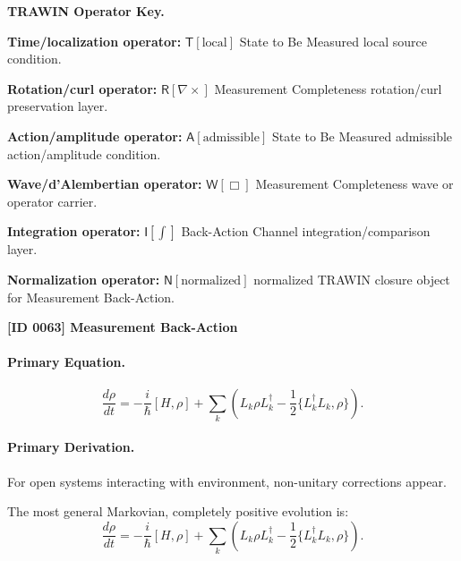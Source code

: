 \par\vspace{0.45\baselineskip}
\noindent\begin{minipage}[t]{\linewidth}
\begingroup
\small
\raggedright
\textbf{TRAWIN Operator Key.}\par
\noindent\textbf{Time/localization operator:} $\mathsf{T}\!\left[\mathrm{local}\right]$ State to Be Measured local source condition.\par
\noindent\textbf{Rotation/curl operator:} $\mathsf{R}\!\left[\nabla\times\right]$ Measurement Completeness rotation/curl preservation layer.\par
\noindent\textbf{Action/amplitude operator:} $\mathsf{A}\!\left[\mathrm{admissible}\right]$ State to Be Measured admissible action/amplitude condition.\par
\noindent\textbf{Wave/d'Alembertian operator:} $\mathsf{W}\!\left[\Box\right]$ Measurement Completeness wave or operator carrier.\par
\noindent\textbf{Integration operator:} $\mathsf{I}\!\left[\int\right]$ Back-Action Channel integration/comparison layer.\par
\noindent\textbf{Normalization operator:} $\mathsf{N}\!\left[\mathrm{normalized}\right]$ normalized TRAWIN closure object for Measurement Back-Action.\par
\endgroup
\end{minipage}

\clearpage
\noindent\textbf{[ID 0063] Measurement Back-Action}\par
\vspace{0.35em}
\paragraph{Primary Equation.}
\begin{equation}
\frac{d\rho}{dt}
=
-\frac{i}{\hbar}[H,\rho]
+
\sum_k
\left(
L_k \rho L_k^\dagger
-
\frac{1}{2}
\{L_k^\dagger L_k,\rho\}
\right).
\end{equation}

\paragraph{Primary Derivation.}
For open systems interacting with environment, non-unitary corrections appear.

The most general Markovian, completely positive evolution is:
\begin{equation}
\boxed{
\frac{d\rho}{dt}
=
-\frac{i}{\hbar}[H,\rho]
+
\sum_k
\left(
L_k \rho L_k^\dagger
-
\frac{1}{2}
\{L_k^\dagger L_k,\rho\}
\right).
}
\end{equation}

